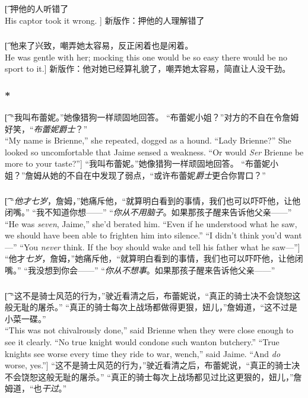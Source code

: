\documentclass[12pt,a4paper]{article}
\begin{document}
\subsubsection{}\t[
	押他的人听错了\\
	His captor took it wrong. ]
	新版作：押他的人理解错了
	
\subsubsection{}\t[
	他来了兴致，嘲弄她太容易，反正闲着也是闲着。\\
	He was gentle with her; mocking this one would be so easy there would be no sport to it.]
	新版作：他对她已经算礼貌了，嘲弄她太容易，简直让人没干劲。
	
\subsubsection{\color{red}*}\t[	
	“我叫布蕾妮。”她像猎狗一样顽固地回答。
	“布蕾妮小姐？”对方的不自在令詹姆好笑，“\emph{布蕾妮爵士}？”\\
	“My name is Brienne,” she repeated, dogged as a hound.
	“Lady Brienne?” She looked so uncomfortable that Jaime sensed a weakness. “Or would \emph{Ser} Brienne be more to your taste?”]
	“我叫布蕾妮。”她像猎狗一样顽固地回答。
	“布蕾妮小姐？”詹姆从她的不自在中发现了弱点，“或许布蕾妮\emph{爵士}更合你胃口？”
	
\subsubsection{}\t[		
	“\emph{他才七岁}，詹姆，”她痛斥他，“就算明白看到的事情，我们也可以吓吓他，让他闭嘴。”
	“我不知道你想——”
	“\emph{你从不用脑子}。如果那孩子醒来告诉他父亲——”\\
	“He was \emph{seven}, Jaime,” she'd berated him. “Even if he understood what he saw, we should have been able to frighten him into silence.”
	“I didn't think you'd want—”
	“You \emph{never} think. If the boy should wake and tell his father what he saw—”]
	“他才\emph{七岁}，詹姆，”她痛斥他，“就算明白看到的事情，我们也可以吓吓他，让他闭嘴。”
	“我没想到你会——”
	“\emph{你从不想事}。如果那孩子醒来告诉他父亲——”
	
\subsubsection{}\t[	
	“这不是骑士风范的行为，”驶近看清之后，布蕾妮说，“真正的骑士决不会饶恕这般无耻的屠杀。”
	“真正的骑士每次上战场都做得更狠，妞儿，”詹姆道，“这不过是小菜一碟。”\\
	“This was not chivalrously done,” said Brienne when they were close enough to see it clearly. “No true knight would condone such wanton butchery.”
	“True knights see worse every time they ride to war, wench,” said Jaime. “And \emph{do} worse, yes.”]	
	“这不是骑士风范的行为，”驶近看清之后，布蕾妮说，“真正的骑士决不会饶恕这般无耻的屠杀。”
	“真正的骑士每次上战场都见过比这更狠的，妞儿，”詹姆道，“也\emph{干过}。”
	
\end{document}
